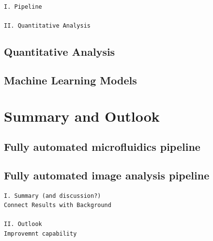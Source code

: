 \documentclass[pdftex,12pt,a4paper]{report}
\begin{document}
\begin{verbatim}
I. Pipeline

II. Quantitative Analysis
\end{verbatim}

\section{Quantitative Analysis}

\section{Machine Learning Models}

\chapter{Summary and Outlook}

\section{Fully automated microfluidics pipeline}

\section{Fully automated image analysis pipeline}

\begin{verbatim}
I. Summary (and discussion?)
Connect Results with Background

II. Outlook
Improvemnt capability
\end{verbatim}





\end{document}
